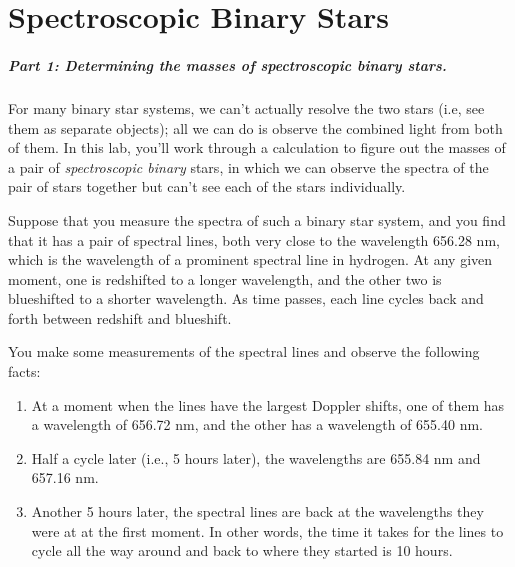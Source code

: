 \chapter{Spectroscopic Binary Stars}


\paragraph{Part 1: Determining the masses of spectroscopic
binary stars.}

For many binary star systems, we can't actually resolve the two stars (i.e,
see
them as separate objects); all we can do is observe the combined light
from both of them. 
In this lab, you'll work through a calculation to figure
out the masses of a pair of \textit{spectroscopic binary} stars,
in which we can observe the spectra of the pair of stars together
but can't see each of the stars individually.

Suppose that you measure the spectra of such a binary star system, and you
find that it has a pair of spectral lines, both very close to the wavelength
656.28 nm, which is the wavelength of a prominent spectral line in hydrogen.
At any given moment, one is redshifted to a longer wavelength,
and the other two is blueshifted to a shorter wavelength. As time passes,
each line cycles back and forth between redshift and blueshift.

You make some measurements of the spectral lines and observe the 
following facts:

\begin{enumerate}
\item At a moment when the lines have the largest Doppler shifts,
one of them has a wavelength of 656.72 nm, and the other
has a wavelength of 655.40 nm. 
\item Half a cycle later (i.e., 5 hours later),
the  wavelengths are 655.84 nm and 657.16 nm.
\item Another 5 hours later, the spectral lines are back at the wavelengths
they were at at the first moment. In other words, the time
it takes for the lines to cycle all the way around and back to where
they started is 10 hours.
\end{enumerate}

